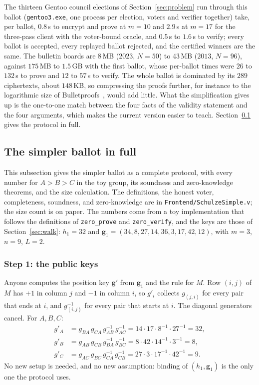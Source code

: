 \documentclass[11pt,a4paper]{article}
\newcommand{\rocq}[1]{\texttt{#1}}
\theoremstyle{remark}
\begin{document}
The thirteen Gentoo council elections of Section~\ref{sec:problem} run
through this ballot (\rocq{gentoo3.exe}, one process per election, voters
and verifier together) take, per ballot, $0.8$\,s to encrypt and prove at
$m = 10$ and $2.9$\,s at $m = 17$ for the three-pass client with the
voter-bound oracle, and $0.5$\,s to $1.6$\,s to verify; every ballot is
accepted, every replayed ballot rejected, and the certified winners are
the same. The bulletin boards are $8$\,MB ($2023$, $N = 50$) to $43$\,MB
($2013$, $N = 96$), against $175$\,MB to $1.5$\,GB with the first ballot,
whose per-ballot times were $26$ to $132$\,s to prove and $12$ to $57$\,s
to verify. The whole ballot is dominated by its $289$ ciphertexts, about
$148$\,KB, so compressing the proofs further, for instance to the
logarithmic size of Bulletproofs~\cite{bulletproofs}, would add little.
What the simplification gives up is the one-to-one match between the four
facts of the validity statement and the four arguments, which makes the
current version easier to teach. Section~\ref{sec:ballot2sd} gives the
protocol in full.

\subsection{The simpler ballot in full}\label{sec:ballot2sd}
This subsection gives the simpler ballot as a complete protocol, with
every number for $A > B > C$ in the toy group, its soundness and
zero-knowledge theorems, and the size calculation. The definitions, the
honest voter, completeness, soundness, and zero-knowledge are in
\rocq{Frontend/SchulzeSimple.v}; the size count is on paper. The numbers
come from a toy implementation that
follows the definitions of \rocq{zero\_prove} and \rocq{zero\_verify}, and
the keys are those of Section~\ref{sec:walk}: $h_1 = 32$ and $\mathbf{g}_1
= (34, 8, 27, 14, 36, 3, 17, 42, 12)$, with $m = 3$, $n = 9$, $L = 2$.

\subsubsection*{Step 1: the public keys}
Anyone computes the position key $\mathbf{g}'$ from $\mathbf{g}_1$ and the
rule for $M$. Row $(i, j)$ of $M$ has $+1$ in column $j$ and $-1$ in column
$i$, so $g'_i$ collects $g_{(j, i)}$ for every pair that ends at $i$, and
$g_{(i, j)}^{-1}$ for every pair that starts at $i$. The diagonal
generators cancel. For $A, B, C$:
\begin{align*}
  g'_A &= g_{BA}\, g_{CA}\, g_{AB}^{-1}\, g_{AC}^{-1} = 14 \cdot 17 \cdot 8^{-1} \cdot 27^{-1} = 32,\\
  g'_B &= g_{AB}\, g_{CB}\, g_{BA}^{-1}\, g_{BC}^{-1} = 8 \cdot 42 \cdot 14^{-1} \cdot 3^{-1} = 8,\\
  g'_C &= g_{AC}\, g_{BC}\, g_{CA}^{-1}\, g_{CB}^{-1} = 27 \cdot 3 \cdot 17^{-1} \cdot 42^{-1} = 9 .
\end{align*}
No new setup is needed, and no new assumption: binding of $(h_1,
\mathbf{g}_1)$ is the only one the protocol uses.
\end{document}
